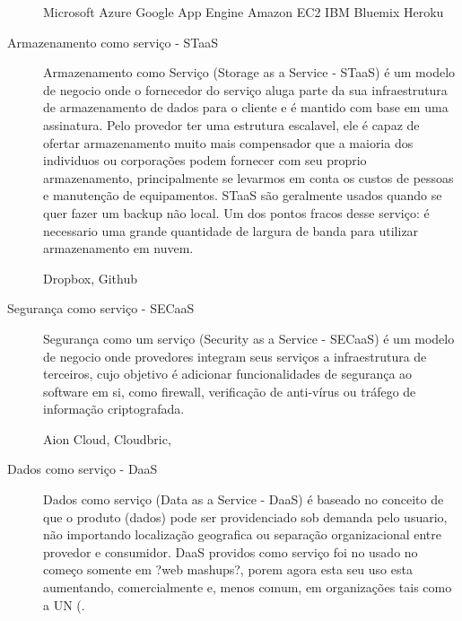 \begin{description}
		Microsoft Azure
		Google App Engine
		Amazon EC2
		IBM Bluemix
		Heroku

		\item[Armazenamento como serviço - STaaS]
		Armazenamento como Serviço (Storage as a Service - STaaS) é um modelo de negocio onde o fornecedor do serviço aluga parte da sua infraestrutura de armazenamento de dados para o cliente e é mantido com base em uma assinatura. Pelo provedor ter uma estrutura escalavel, ele é capaz de ofertar armazenamento muito mais compensador que a maioria dos individuos ou corporações podem fornecer com seu proprio armazenamento, principalmente se levarmos em conta os custos de pessoas e manutenção de equipamentos. STaaS são geralmente usados quando se quer fazer um backup não local. Um dos pontos fracos desse serviço: é necessario uma grande quantidade de largura de banda para utilizar armazenamento em nuvem.
	
		Dropbox, Github 

		\item[Segurança como serviço - SECaaS]
		Segurança como um serviço (Security as a Service - SECaaS) é um modelo de negocio onde provedores integram seus serviços a infraestrutura de terceiros, cujo objetivo é adicionar funcionalidades de segurança ao software em si, como firewall, verificação de anti-vírus ou tráfego de informação criptografada.
	
		Aion Cloud, Cloudbric, 

		\item[Dados como serviço - DaaS]
		Dados como serviço (Data as a Service - DaaS) é baseado no conceito de que o produto (dados) pode ser providenciado sob demanda pelo usuario, não importando localização geografica ou separação organizacional entre provedor e consumidor. DaaS providos como serviço foi no usado no começo somente em ?web mashups?, porem agora esta seu uso esta aumentando, comercialmente e, menos comum, em organizações tais como a UN (.
	


\end{description}
